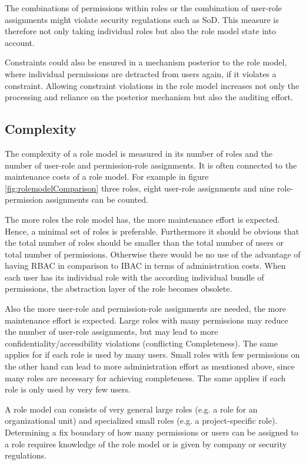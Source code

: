         The combinations of permissions within roles or the combination of user-role assignments might violate security regulations such as SoD. This measure is therefore not only taking individual roles but also the role model state into account.
        
        Constraints could also be ensured in a mechanism posterior to the role model, where individual permissions are detracted from users again, if it violates a constraint. Allowing constraint violations in the role model increases not only the processing and reliance on the posterior mechanism but also the auditing effort.
        \subsection{Complexity}
        \label{sec:complexity}
        The complexity of a role model is measured in its number of roles and the number of user-role and permission-role assignments. It is often connected to the maintenance costs of a role model. For example in figure \ref{fig:rolemodelComparison} three roles, eight user-role assignments and nine role-permission assignments can be counted.
        
        The more roles the role model has, the more maintenance effort is expected. Hence, a minimal set of roles is preferable. Furthermore it should be obvious that the total number of roles should be smaller than the total number of users or total number of permissions. Otherwise there would be no use of the advantage of having RBAC in comparison to IBAC in terms of administration costs. When each user has its individual role with the according individual bundle of permissions, the abstraction layer of the role becomes obsolete.
        
        Also the more user-role and permission-role assignments are needed, the more maintenance effort is expected. Large roles with many permissions may reduce the number of user-role assignments, but may lead to more confidentiality/accessibility violations (conflicting Completeness). The same applies for if each role is used by many users. Small roles with few permissions on the other hand can lead to more administration effort as mentioned above, since many roles are necessary for achieving completeness. The same applies if each role is only used by very few users.
        
        A role model can consists of very general large roles (e.g. a role for an organizational unit) and specialized small roles (e.g. a project-specific role). Determining a fix boundary of how many permissions or users can be assigned to a role requires knowledge of the role model or is given by company or security regulations.
